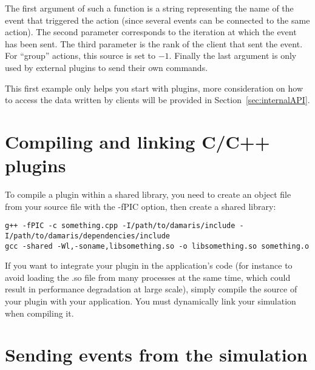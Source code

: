\noindent\begin{minipage}{\textwidth}
\vspace{0.5cm}

\end{minipage}

The first argument of such a function is a string representing the name of the event that triggered
the action (since several events can be connected to the same action). The second parameter
corresponds to the iteration at which the event has been sent. The third parameter is the rank
of the client that sent the event. For ``group'' actions, this source is set to $-1$.
Finally the last argument is only used by external plugins to send their own commands.

This first example only helps you start with plugins, more consideration on how to
access the data written by clients will be provided in Section~\ref{sec:internalAPI}.

\section{Compiling and linking C/C++ plugins}

To compile a plugin within a shared library, 
you need to create an object file from your source file with the -fPIC option,
then create a shared library:
\begin{verbatim}
g++ -fPIC -c something.cpp -I/path/to/damaris/include -I/path/to/damaris/dependencies/include
gcc -shared -Wl,-soname,libsomething.so -o libsomething.so something.o
\end{verbatim}

If you want to integrate your plugin in the application's code (for instance to avoid
loading the .so file from many processes at the same time, which could result in performance
degradation at large scale), simply compile the source of your plugin with your application. You must
dynamically link your simulation when compiling it.


\section{Sending events from the simulation}


